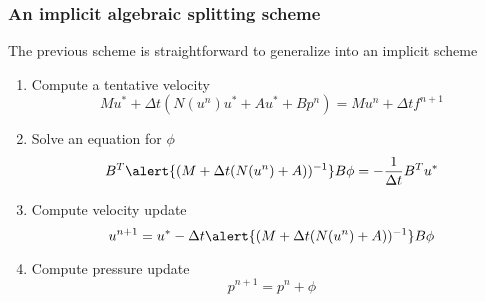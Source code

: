 \begin{frame}
\frametitle{An implicit algebraic splitting scheme}
The previous scheme is straightforward to generalize into an implicit scheme  
\begin{enumerate}
\item  Compute a tentative velocity 
\[
M u^{*} +  \Delta t ( N(u^n) u^*  +  A u^* +  B p^n) =  M u^n + \Delta t  f^{n+1}  
\]
\item  Solve an equation for $\phi$ 
\[
B^T \alert{(M + \Delta t (N(u^n)   +  A)) ^{-1}} B \phi = - \frac{1}{\Delta t} B^T u^* 
\]
\item  Compute velocity update 
\[
u^{n+1} = u^* - \Delta t \alert{(M + \Delta t (N(u^n)  +  A )) ^{-1}} B \phi 
\]
\item  Compute pressure update 
\[
p^{n+1} = p^n + \phi 
\]
\end{enumerate}
\end{frame}

